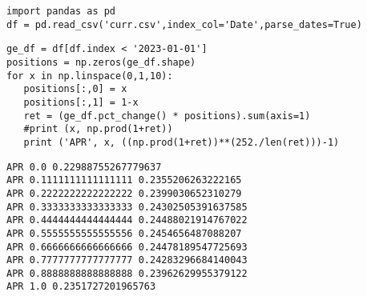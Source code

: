 \documentclass[12pt,fleqn]{article}\usepackage{../../common}
\begin{document}
\begin{verbatim}
import pandas as pd
df = pd.read_csv('curr.csv',index_col='Date',parse_dates=True)
\end{verbatim}

\begin{verbatim}
ge_df = df[df.index < '2023-01-01']
positions = np.zeros(ge_df.shape)
for x in np.linspace(0,1,10):
   positions[:,0] = x
   positions[:,1] = 1-x
   ret = (ge_df.pct_change() * positions).sum(axis=1)
   #print (x, np.prod(1+ret))
   print ('APR', x, ((np.prod(1+ret))**(252./len(ret)))-1)
\end{verbatim}

\begin{verbatim}
APR 0.0 0.22988755267779637
APR 0.1111111111111111 0.2355206263222165
APR 0.2222222222222222 0.2399030652310279
APR 0.3333333333333333 0.24302505391637585
APR 0.4444444444444444 0.24488021914767022
APR 0.5555555555555556 0.2454656487088207
APR 0.6666666666666666 0.24478189547725693
APR 0.7777777777777777 0.24283296684140043
APR 0.8888888888888888 0.23962629955379122
APR 1.0 0.2351727201965763
\end{verbatim}
\end{document}
